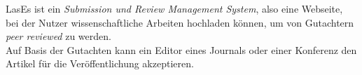 
LasEs ist ein \emph{Submission und Review Management System}, also eine Webseite, bei der Nutzer wissenschaftliche Arbeiten hochladen können, um von Gutachtern \emph{peer reviewed} zu werden.\\
Auf Basis der Gutachten kann ein Editor eines Journals oder einer Konferenz den Artikel für die Veröffentlichung akzeptieren.
